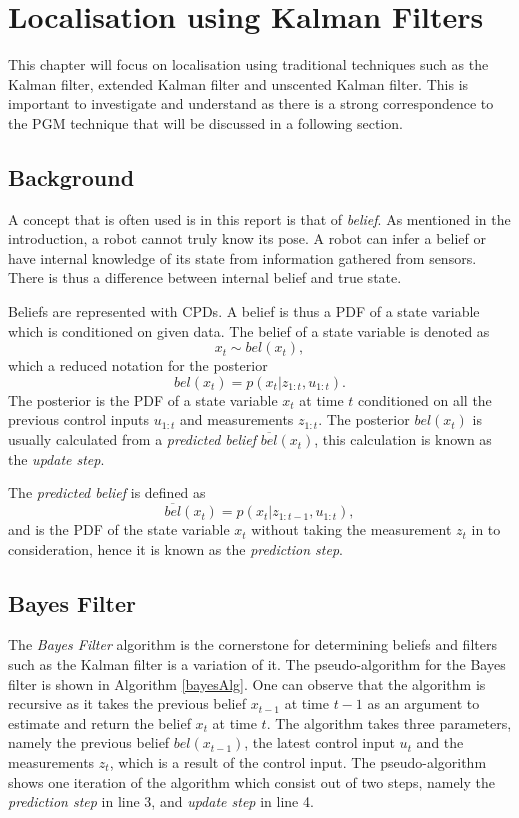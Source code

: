 \documentclass[12pt,oneside,openany,a4paper, %
afrikaans,english,
]{memoir}
\numberwithin{equation}{chapter}
\begin{document}
\chapter{Localisation using Kalman Filters}
This chapter will focus on localisation using traditional techniques such as the Kalman filter, extended Kalman filter and unscented Kalman filter. This is important to investigate and understand as there is a strong correspondence to the PGM technique that will be discussed in a following section.
\section{Background}
A concept that is often used is in this report is that of \textit{belief}. As mentioned in the introduction, a robot cannot truly know its pose. A robot can infer a belief or have internal knowledge of its state from information gathered from sensors. There is thus a difference between internal belief and true state.

Beliefs are represented with CPDs. A belief is thus a PDF of a state variable which is conditioned on given data. The belief of a state variable is denoted as
\begin{equation}
x_t \sim bel(x_t),
\end{equation}
which a reduced notation for the posterior
\begin{equation}
bel(x_t) = p(x_t| z_{1:t}, u_{1:t}).
\end{equation}
The posterior is the PDF of a state variable $x_t$ at time $t$ conditioned on all the previous control inputs $u_{1:t}$ and measurements $z_{1:t}$. The posterior $bel(x_t)$ is usually calculated from a \textit{predicted belief} $\overline{bel}(x_t)$, this calculation is known as the \textit{update step}.

The \textit{predicted belief} is defined as
\begin{equation}
\overline{bel}(x_t) = p(x_t|z_{1:t-1}, u_{1:t}),
\end{equation} 
and is the PDF of the state variable $x_t$ without taking the measurement $z_t$ in to consideration, hence it is known as the \textit{prediction step}.
\section{Bayes Filter}
The \textit{Bayes Filter} algorithm is the cornerstone for determining beliefs and filters such as the Kalman filter is a variation of it. The pseudo-algorithm for the Bayes filter is shown in Algorithm \ref{bayesAlg}. One can observe that the algorithm is recursive as it takes the previous belief $x_{t-1}$ at time $t-1$ as an argument to estimate and return the belief $x_t$ at time $t$. The algorithm takes three parameters, namely the previous belief $bel(x_{t-1})$, the latest control input $u_t$ and the measurements $z_t$, which is a result of the control input. The pseudo-algorithm shows one iteration of the algorithm which consist out of two steps, namely the \textit{prediction step} in line 3, and \textit{update step} in line 4.
\end{document}
